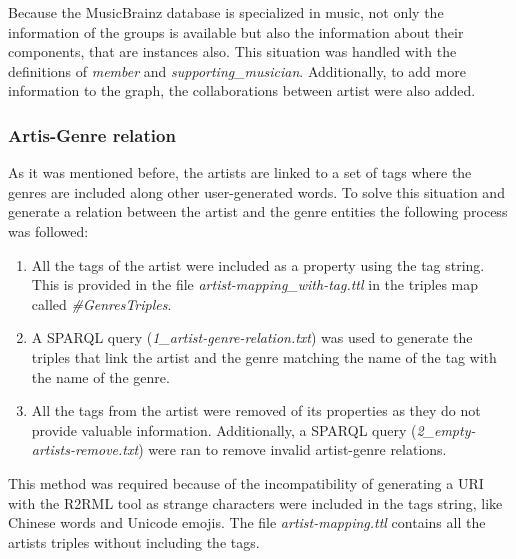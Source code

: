Because the MusicBrainz database is specialized in music, not only the information of the groups is available but also the information about their components, that are instances also. This situation was handled with the definitions of \textit{member} and \textit{supporting\_musician}. Additionally, to add more information to the graph, the collaborations between artist were also added. 

\subsubsection{Artis-Genre relation}
As it was mentioned before, the artists are linked to a set of tags where the genres are included along other user-generated words.
To solve this situation and generate a relation between the artist and the genre entities the following process was followed:

\begin{enumerate}
\item All the tags of the artist were included as a property using the tag string. This is provided in the file \textit{artist-mapping\_with-tag.ttl} in the triples map called \textit{\#GenresTriples}.

\item A SPARQL query (\textit{1\_artist-genre-relation.txt}) was used to generate the triples that link the artist and the genre matching the name of the tag with the name of the genre.

\item All the tags from the artist were removed of its properties as they do not provide valuable information.
Additionally, a SPARQL query (\textit{2\_empty-artists-remove.txt}) were ran to remove invalid artist-genre relations.
\end{enumerate}

This method was required because of the incompatibility of generating a URI with the R2RML tool as strange characters were included in the tags string, like Chinese words and Unicode emojis. 
The file \textit{artist-mapping.ttl} contains all the artists triples without including the tags.

